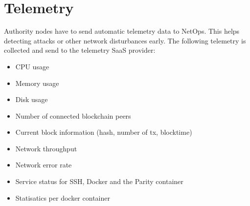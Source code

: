 \section{Telemetry}

Authority nodes have to send automatic telemetry data to NetOps. This helps detecting attacks or other network disturbances early.
The following telemetry is collected and send to the telemetry SaaS provider:

\begin{itemize}
    \item CPU usage
    \item Memory usage
    \item Disk usage
    \item Number of connected blockchain peers
    \item Current block information (hash, number of tx, blocktime)
    \item Network throughput
    \item Network error rate
    \item Service status for SSH, Docker and the Parity container
    \item Statisatics per docker container
\end{itemize}